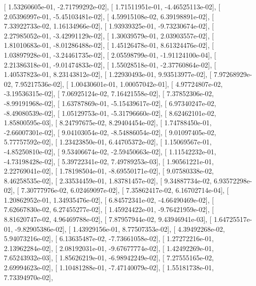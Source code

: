 \documentclass{article}
\begin{document}
       [  1.53260605e-01,  -2.71799292e-02],
       [  1.71511951e-01,  -4.46525113e-02],
       [  2.05396997e-01,  -5.45103481e-02],
       [  4.59915108e-02,   6.39198891e-02],
       [  7.33922733e-02,   1.16134966e-02],
       [  1.93939325e-01,  -9.73230674e-02],
       [  2.27985052e-01,  -3.42991129e-02],
       [  1.30039579e-01,   2.03903557e-02],
       [  1.81010683e-01,  -8.01286488e-02],
       [  1.45126478e-01,   8.61324476e-02],
       [  1.03897928e-01,  -3.24461735e-02],
       [  2.05598799e-01,  -1.91124100e-04],
       [  2.21386318e-01,  -9.01474833e-02],
       [  1.55028518e-01,  -2.37760864e-02],
       [  1.40537823e-01,   8.23143812e-02],
       [  1.22930493e-01,   9.93513977e-02],
       [  7.97268929e-02,   7.95217536e-02],
       [  1.00430601e-01,   1.00057042e-01],
       [  4.97724807e-02,  -3.19536315e-02],
       [  7.06925124e-02,   7.16421558e-02],
       [  7.37852306e-02,  -8.99191968e-02],
       [  1.63787869e-01,  -5.15439617e-02],
       [  6.97340247e-02,  -8.49080539e-02],
       [  1.05129753e-01,  -5.31796660e-02],
       [  8.62462101e-02,   1.85800595e-03],
       [  8.24797675e-02,   8.29404454e-02],
       [  1.74788450e-01,  -2.66007301e-02],
       [  9.04103054e-02,  -8.54886054e-02],
       [  9.01097405e-02,   5.77757592e-02],
       [  1.23423850e-01,   6.44705372e-02],
       [  1.15069567e-01,  -4.85250810e-02],
       [  9.53406674e-02,  -2.59450663e-02],
       [  1.11542232e-01,  -4.73198428e-02],
       [  5.39722341e-02,   7.49789253e-03],
       [  1.90561221e-01,   2.22769041e-02],
       [  1.78198504e-01,  -8.69550171e-02],
       [  9.07580338e-02,   8.46258535e-02],
       [  2.33534459e-01,   1.83781457e-02],
       [  9.34887734e-02,   6.93572298e-02],
       [  7.30777976e-02,   6.02469097e-02],
       [  7.35862417e-02,   6.16702714e-04],
       [  1.20862952e-01,   1.34935476e-02],
       [  6.84572341e-02,  -4.66490469e-02],
       [  7.62667830e-02,   6.27455277e-02],
       [  1.45924422e-01,  -9.76421959e-02],
       [  8.81620747e-02,   4.96469788e-02],
       [  7.87957944e-02,   9.43946941e-03],
       [  1.64725517e-01,  -9.82905386e-02],
       [  1.43929156e-01,   8.77507353e-02],
       [  4.39492268e-02,   5.94073216e-02],
       [  6.13635487e-02,  -7.73661058e-02],
       [  1.27272216e-01,   2.13962284e-02],
       [  2.08192031e-01,  -9.67677774e-02],
       [  1.42492269e-01,   7.65243932e-03],
       [  1.85626219e-01,  -6.98942249e-02],
       [  7.27555165e-02,   2.69994623e-02],
       [  1.10481288e-01,  -7.47140079e-02],
       [  1.55181738e-01,   7.73394970e-02],
\end{document}
